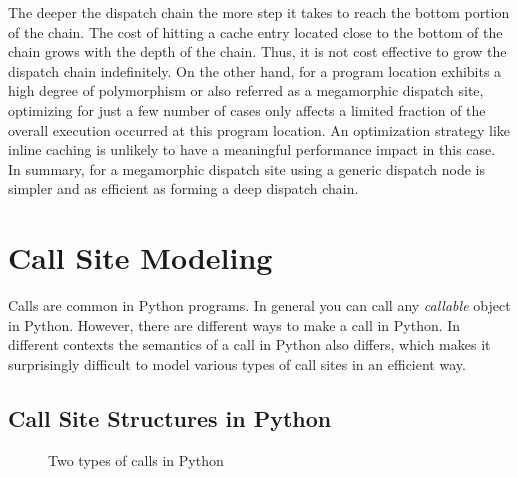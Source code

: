 The deeper the dispatch chain the more step it takes to reach the bottom portion of the chain.
The cost of hitting a cache entry located close to the bottom of the chain grows with the depth of the chain.
Thus, it is not cost effective to grow the dispatch chain indefinitely.
On the other hand, for a program location exhibits a high degree of polymorphism or also referred as a megamorphic dispatch site,
optimizing for just a few number of cases only affects a limited fraction of the overall execution occurred at this program location.
An optimization strategy like inline caching is unlikely to have a meaningful performance impact in this case.
In summary, for a megamorphic dispatch site using a generic dispatch node is simpler and as efficient as forming a deep dispatch chain.

\section{Call Site Modeling}

Calls are common in Python programs.
In general you can call any \emph{callable} object in Python.
However, there are different ways to make a call in Python.
In different contexts the semantics of a call in Python also differs, which makes it surprisingly difficult to model various types of call sites in an efficient way.

\subsection{Call Site Structures in Python}
\label{sec:ch5-structure-of-call-sites}

\begin{figure}
\centering
{}
\caption{Two types of calls in Python}
\label{fig:ch5-call-site-synteax-code}
\end{figure}

